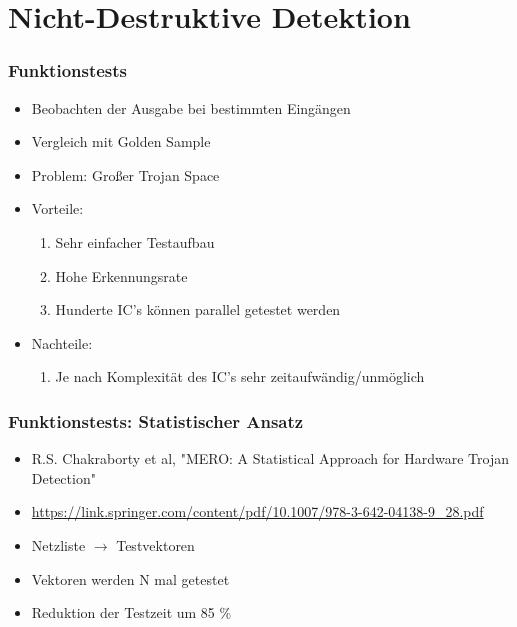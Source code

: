 \documentclass[11pt]{beamer}
\begin{document}
\section{Nicht-Destruktive Detektion}
\begin{frame}
    \frametitle{Funktionstests}
    \begin{itemize}
        \item Beobachten der Ausgabe bei bestimmten Eingängen
        \item Vergleich mit Golden Sample
        \item Problem: Großer Trojan Space
        \item Vorteile:
        \begin{enumerate}
            \item Sehr einfacher Testaufbau
            \item Hohe Erkennungsrate
            \item Hunderte IC's können parallel getestet werden
        \end{enumerate}
        \item Nachteile:
        \begin{enumerate}
            \item Je nach Komplexität des IC's sehr zeitaufwändig/unmöglich
        \end{enumerate}
    \end{itemize}
\end{frame}
\begin{frame}
    \frametitle{Funktionstests: Statistischer Ansatz}
    \begin{itemize}
        \item R.S. Chakraborty et al, "MERO: A Statistical Approach for Hardware Trojan Detection"
        \item \url{https://link.springer.com/content/pdf/10.1007/978-3-642-04138-9_28.pdf}
        \item Netzliste $\rightarrow$ Testvektoren
        \item Vektoren werden N mal getestet
        \item Reduktion der Testzeit um 85 \%
    \end{itemize}
\end{frame}
\end{document}
